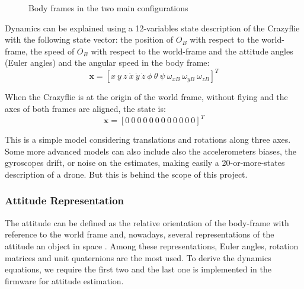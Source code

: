 \documentclass[a4paper, 12pt]{report}
\begin{document}
\begin{figure}[htbp]
\centering
{}
\hspace{0.5cm}
\caption{Body frames in the two main configurations}
\label{fig:frames}
\end{figure}
  
Dynamics can be explained using a 12-variables state description of the Crazyflie with the following state vector: the position of $O_B$ with respect to the world-frame, the speed of $O_B$ with respect to the world-frame and  the attitude angles (Euler angles) and the angular speed in the body frame:
 \[\boldsymbol{x} =  [x \ y \ z \ \dot x \ \dot y \ \dot z \ \phi \ \theta \ \psi \ \omega_{xB} \ \omega_{yB} \ \omega_{zB}]^T \]

When the Crazyflie is at the origin of the world frame, without flying and the axes of both frames are aligned, the state is:
 \[\boldsymbol{x} =  [0 \ 0 \ 0 \ 0 \ 0 \ 0 \ 0 \ 0 \ 0 \ 0 \ 0 \ 0 ]^T\]
 
This is a simple model considering translations and rotations along three axes. Some more advanced models can also include also the accelerometers biases, the gyroscopes drift, or noise on the estimates, making easily a 20-or-more-states description of a drone. But this is behind the scope of this project.

\subsubsection{Attitude Representation}
The attitude can be defined as the relative orientation of the body-frame with reference to the world frame and, nowadays, several representations of the attitude  an object in space \cite{Diebel2006}. Among these representations, Euler angles, rotation matrices and unit quaternions are the most used. To derive the dynamics equations, we require the first two and the last one is implemented in the firmware for attitude estimation.
\end{document}
